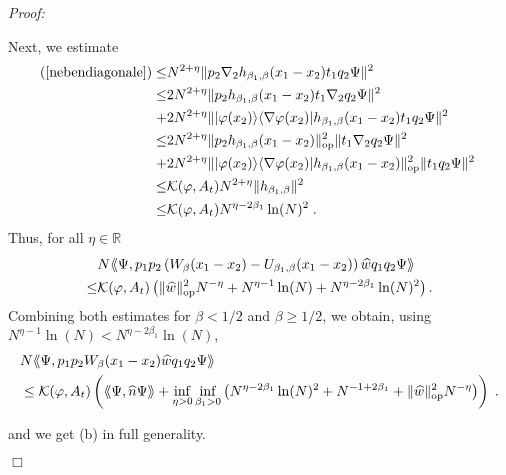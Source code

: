 \documentclass[11pt, english, american]{article}
\newcommand{\laa}{\langle\hspace{-0.08cm}\langle}
\newcommand{\raa}{\rangle\hspace{-0.08cm}\rangle}
\newenvironment{proof}{\emph{Proof:}}{\begin{flushright} $ \Box $ \end{flushright}}
\renewcommand{\phi}{\varphi}
\begin{document}
\begin{proof}
\begin{enumerate}
Next, we estimate 
\begin{align*}
(\ref{nebendiagonale})\leq& N^{2+\eta}\| p_2
\nabla_2 h_{\beta_1,\beta}(x_1-x_2)t_1 q_2
\Psi\|^2\
\nonumber
\\
\leq&
2N^{2+\eta}\| p_2
 h_{\beta_1,\beta}(x_1-x_2)t_1 \nabla_2q_2
\Psi\|^2
\nonumber
\\+&
2N^{2+\eta}\||\varphi(x_2)\rangle \langle \nabla \varphi(x_2)|
 h_{\beta_1,\beta}(x_1-x_2)t_1 q_2
\Psi\|^2\
\nonumber
\\
\leq &
2N^{2+\eta}\| p_2
 h_{\beta_1,\beta}(x_1-x_2)
 \|_{\text{op}}^2
 \|
t_1 
  \nabla_2 q_2
\Psi\|^2\
\nonumber
\\
+&
2N^{2+\eta}
\| |\varphi(x_2)\rangle \langle \nabla \varphi(x_2)|
 h_{\beta_1,\beta}(x_1-x_2) \|_{\text{op}}^2
  \| t_1 q_2
\Psi\|^2\
\nonumber
\\
\leq &
 \mathcal{K}(\phi, A_t)
 N^{2+\eta}
\| h_{\beta_1,\beta} \|^2
\nonumber
\\ \leq&
 \mathcal{K}(\phi, A_t)
N^{\eta- 2\beta_1} \ln(N)^2
\;.
\end{align*}
Thus, for all $\eta \in \mathbb{R}$
\begin{align*}
&  N\laa\Psi, p_1p_2
  \left(W_{\beta}(x_1-x_2)-U_{\beta_1,\beta}(x_1-x_2)\right)
  \widehat{w}q_1q_2\Psi\raa
  \nonumber
\\ 
  \leq &
  \mathcal{K}(\phi,A_t)
  \left(\| \widehat{w}\|_{\text{op}}^2  N^{ - \eta} + N^{ \eta-1} \ln(N) +N^{ \eta- 2 \beta_1} \ln(N)^2 \right).
\end{align*}
Combining both estimates for  $\beta<1/2$ and $\beta \geq 1/2$, we obtain,
using $ N^{ \eta-1} \ln(N) < N^{ \eta- 2 \beta_1} \ln(N)$, 
 \begin{align*} 
 & N\laa\Psi, p_1p_2
  W_{\beta}(x_1-x_2)
  \widehat{w}q_1q_2\Psi\raa
  \nonumber
\\ 
 & \leq 
\mathcal{K}(\phi,A_t)
	\left(
		\laa \Psi, \widehat{n} \Psi \raa 
		 +
		  \inf_{\eta>0}
  \inf_{\beta_1 >0}
  \left(
 			N^{ \eta- 2 \beta_1} \ln(N)^2
 				 +N^{-1+2 \beta_1}
+
\| \widehat{w}\|_{\text{op}}^2  N^{ - \eta}
\right)  
\right) 
   \;.
\end{align*}

 and we get (b)  in full generality.





\end{enumerate}
\end{proof}
\end{document}

